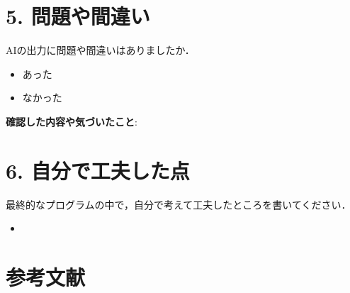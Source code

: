 \documentclass[a4paper,11pt]{jsarticle}
\begin{document}
\section*{5. 問題や間違い}
AIの出力に問題や間違いはありましたか．
\begin{itemize}
    \item[$\boxtimes$] あった
    \item[$\square$] なかった
\end{itemize}
\textbf{確認した内容や気づいたこと}:


\section*{6. 自分で工夫した点}
最終的なプログラムの中で，自分で考えて工夫したところを書いてください．
\begin{itemize}
    \item 
\end{itemize}

\section*{参考文献}
\end{document}
